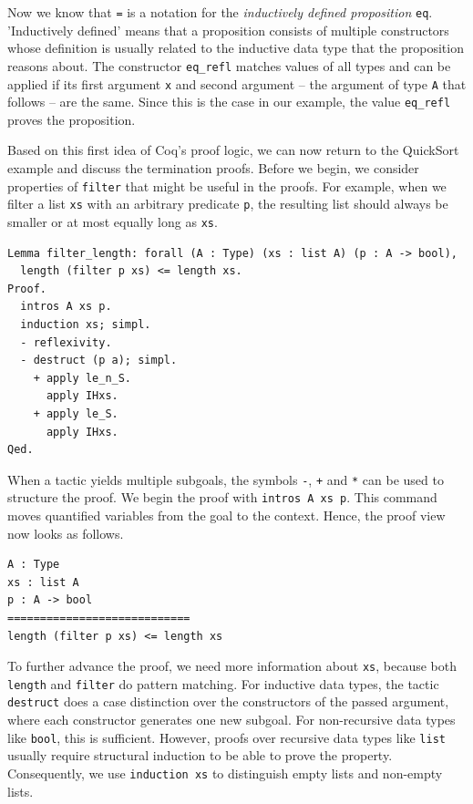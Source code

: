 \documentclass[a4paper, 11pt, fleqn, twoside, abstract=on]{scrreprt}
\newcommand{\cinl}[1]{\texttt{#1}}
\begin{document}
Now we know that \cinl{=} is a notation for the \textit{inductively defined proposition} \cinl{eq}.
'Inductively defined' means that a proposition consists of multiple constructors whose definition is usually related to the inductive data type that the proposition reasons about.
The constructor \cinl{eq_refl} matches values of all types and can be applied if its first argument \cinl{x} and second argument -- the argument of type \cinl{A} that follows -- are the same.
Since this is the case in our example, the value \cinl{eq_refl} proves the proposition.

Based on this first idea of Coq's proof logic, we can now return to the QuickSort example and discuss the termination proofs.
Before we begin, we consider properties of \cinl{filter} that might be useful in the proofs.
For example, when we filter a list \cinl{xs} with an arbitrary predicate \cinl{p}, the resulting list should always be smaller or at most equally long as \cinl{xs}.

\begin{verbatim}
Lemma filter_length: forall (A : Type) (xs : list A) (p : A -> bool),
  length (filter p xs) <= length xs.
Proof.
  intros A xs p.
  induction xs; simpl.
  - reflexivity.
  - destruct (p a); simpl.
    + apply le_n_S.
      apply IHxs.
    + apply le_S.
      apply IHxs.
Qed.
\end{verbatim}

When a tactic yields multiple subgoals, the symbols \cinl{-}, \cinl{+} and \cinl{*} can be used to structure the proof.
We begin the proof with \cinl{intros A xs p}. 
This command moves quantified variables from the goal to the context.
Hence, the proof view now looks as follows.

\begin{verbatim}
A : Type
xs : list A
p : A -> bool
============================
length (filter p xs) <= length xs
\end{verbatim}

To further advance the proof, we need more information about \cinl{xs}, because both \cinl{length} and \cinl{filter} do pattern matching.
For inductive data types, the tactic \cinl{destruct} does a case distinction over the constructors of the passed argument, where each constructor generates one new subgoal.
For non-recursive data types like \cinl{bool}, this is sufficient.
However, proofs over recursive data types like \cinl{list} usually require structural induction to be able to prove the property.
Consequently, we use \cinl{induction xs} to distinguish empty lists and non-empty lists.
\end{document}

